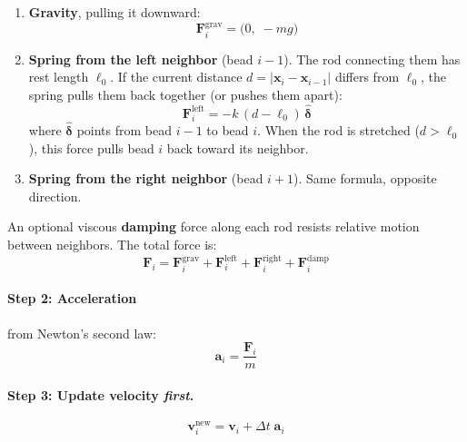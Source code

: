 \documentclass[11pt,a4paper]{article}
\begin{document}
\begin{enumerate}
    \item \textbf{Gravity}, pulling it downward:
    \begin{equation}
        \mathbf{F}^{\text{grav}}_i = \bigl(0,\; -mg\bigr)
    \end{equation}

    \item \textbf{Spring from the left neighbor} (bead $i-1$).
    The rod connecting them has rest length $\ell_0$. If the current
    distance $d = |\mathbf{x}_i - \mathbf{x}_{i-1}|$ differs from
    $\ell_0$, the spring pulls them back together (or pushes them apart):
    \begin{equation}
        \mathbf{F}^{\text{left}}_i
        = -k\,(d - \ell_0)\,\hat{\boldsymbol{\delta}}
    \end{equation}
    where $\hat{\boldsymbol{\delta}}$ points from bead $i{-}1$ to bead $i$.
    When the rod is stretched ($d > \ell_0$), this force pulls bead $i$
    back toward its neighbor.

    \item \textbf{Spring from the right neighbor} (bead $i+1$). Same
    formula, opposite direction.
\end{enumerate}

An optional viscous \textbf{damping} force along each rod resists relative
motion between neighbors. The total force is:
\begin{equation}
    \mathbf{F}_i = \mathbf{F}^{\text{grav}}_i
                 + \mathbf{F}^{\text{left}}_i
                 + \mathbf{F}^{\text{right}}_i
                 + \mathbf{F}^{\text{damp}}_i
\end{equation}

\paragraph{Step 2: Acceleration} from Newton's second law:
\begin{equation}
    \mathbf{a}_i = \frac{\mathbf{F}_i}{m}
\end{equation}

\paragraph{Step 3: Update velocity \emph{first}.}
\begin{equation}
    \mathbf{v}_i^{\text{new}}
    = \mathbf{v}_i + \Delta t \;\mathbf{a}_i
\end{equation}
\end{document}
